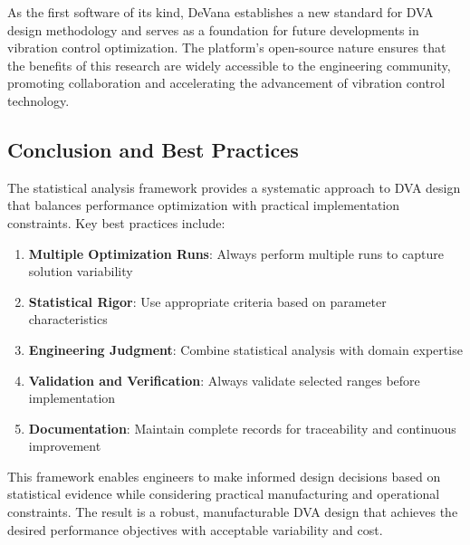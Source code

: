 \documentclass[12pt,a4paper]{article}
\newcommand{\softwareName}{DeVana}
\begin{document}
As the first software of its kind, \softwareName{} establishes a new standard for DVA design methodology and serves as a foundation for future developments in vibration control optimization. The platform's open-source nature ensures that the benefits of this research are widely accessible to the engineering community, promoting collaboration and accelerating the advancement of vibration control technology.

\subsection{Conclusion and Best Practices}

The statistical analysis framework provides a systematic approach to DVA design that balances performance optimization with practical implementation constraints. Key best practices include:

\begin{enumerate}
    \item \textbf{Multiple Optimization Runs}: Always perform multiple runs to capture solution variability
    \item \textbf{Statistical Rigor}: Use appropriate criteria based on parameter characteristics
    \item \textbf{Engineering Judgment}: Combine statistical analysis with domain expertise
    \item \textbf{Validation and Verification}: Always validate selected ranges before implementation
    \item \textbf{Documentation}: Maintain complete records for traceability and continuous improvement
\end{enumerate}

This framework enables engineers to make informed design decisions based on statistical evidence while considering practical manufacturing and operational constraints. The result is a robust, manufacturable DVA design that achieves the desired performance objectives with acceptable variability and cost.
\end{document}
